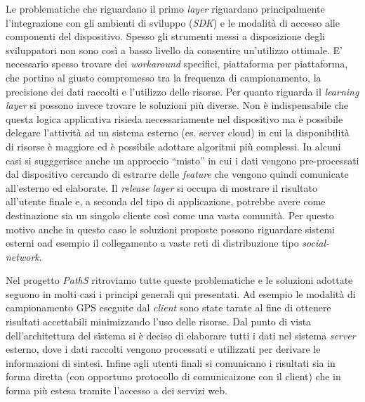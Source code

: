 Le problematiche che riguardano il primo \emph{layer} riguardano principalmente l'integrazione con gli ambienti di sviluppo (\emph{SDK}) e le modalità di accesso alle componenti del dispositivo. Spesso gli strumenti messi a disposizione degli sviluppatori non sono così a basso livello da consentire un'utilizzo ottimale. E' necessario spesso trovare dei \emph{workaround} specifici, piattaforma per piattaforma, che portino al giusto compromesso tra la frequenza di campionamento, la precisione dei dati raccolti e l'utilizzo delle risorse.
Per quanto riguarda il \emph{learning layer} si possono invece trovare le soluzioni più diverse. Non è indispensabile che questa logica applicativa risieda necessariamente nel dispositivo ma è possibile delegare l'attività ad un sistema esterno (es. server cloud) in cui la disponibilità di risorse è maggiore ed è possibile adottare algoritmi più complessi. In alcuni casi si sugggerisce anche un approccio ``misto'' in cui i dati vengono pre-processati dal dispositivo cercando di estrarre delle \emph{feature} che vengono quindi comunicate all'esterno ed elaborate.
Il \emph{release layer} si occupa di mostrare il risultato all'utente finale e, a seconda del tipo di applicazione, potrebbe avere come destinazione sia un singolo cliente così come una vasta comunità. Per questo motivo anche in questo caso le soluzioni proposte possono riguardare sistemi esterni oad esempio il collegamento a vaste reti di distribuzione tipo \emph{social-network}.

Nel progetto \emph{PathS} ritroviamo tutte queste problematiche e le soluzioni adottate seguono in molti casi i principi generali qui presentati. Ad esempio le modalità di campionamento GPS eseguite dal \emph{client} sono state tarate al fine di ottenere risultati accettabili minimizzando l'uso delle risorse. Dal punto di vista dell'architettura del sistema si è deciso di elaborare tutti i dati nel sistema \emph{server} esterno, dove i dati raccolti vengono processati e utilizzati per derivare le informazioni di sintesi. Infine agli utenti finali si comunicano i risultati sia in forma diretta (con opportuno protocollo di comunicaizone con il client) che in forma più estesa tramite l'accesso a dei servizi web.



